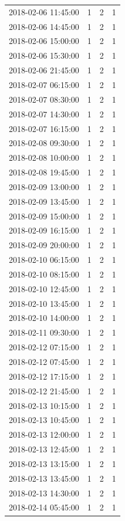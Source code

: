 \begin{tabular}{lrrr}
2018-02-06 11:45:00 & 1 & 2 & 1 \\
2018-02-06 14:45:00 & 1 & 2 & 1 \\
2018-02-06 15:00:00 & 1 & 2 & 1 \\
2018-02-06 15:30:00 & 1 & 2 & 1 \\
2018-02-06 21:45:00 & 1 & 2 & 1 \\
2018-02-07 06:15:00 & 1 & 2 & 1 \\
2018-02-07 08:30:00 & 1 & 2 & 1 \\
2018-02-07 14:30:00 & 1 & 2 & 1 \\
2018-02-07 16:15:00 & 1 & 2 & 1 \\
2018-02-08 09:30:00 & 1 & 2 & 1 \\
2018-02-08 10:00:00 & 1 & 2 & 1 \\
2018-02-08 19:45:00 & 1 & 2 & 1 \\
2018-02-09 13:00:00 & 1 & 2 & 1 \\
2018-02-09 13:45:00 & 1 & 2 & 1 \\
2018-02-09 15:00:00 & 1 & 2 & 1 \\
2018-02-09 16:15:00 & 1 & 2 & 1 \\
2018-02-09 20:00:00 & 1 & 2 & 1 \\
2018-02-10 06:15:00 & 1 & 2 & 1 \\
2018-02-10 08:15:00 & 1 & 2 & 1 \\
2018-02-10 12:45:00 & 1 & 2 & 1 \\
2018-02-10 13:45:00 & 1 & 2 & 1 \\
2018-02-10 14:00:00 & 1 & 2 & 1 \\
2018-02-11 09:30:00 & 1 & 2 & 1 \\
2018-02-12 07:15:00 & 1 & 2 & 1 \\
2018-02-12 07:45:00 & 1 & 2 & 1 \\
2018-02-12 17:15:00 & 1 & 2 & 1 \\
2018-02-12 21:45:00 & 1 & 2 & 1 \\
2018-02-13 10:15:00 & 1 & 2 & 1 \\
2018-02-13 10:45:00 & 1 & 2 & 1 \\
2018-02-13 12:00:00 & 1 & 2 & 1 \\
2018-02-13 12:45:00 & 1 & 2 & 1 \\
2018-02-13 13:15:00 & 1 & 2 & 1 \\
2018-02-13 13:45:00 & 1 & 2 & 1 \\
2018-02-13 14:30:00 & 1 & 2 & 1 \\
2018-02-14 05:45:00 & 1 & 2 & 1 \\

\end{tabular}
